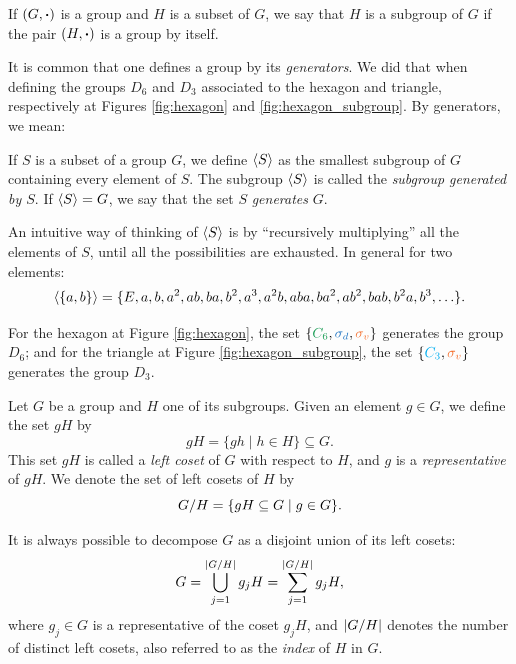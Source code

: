 \begin{definition} \label{def:subgroup}
If $(G, \vdot)$ is a group and $H$ is a subset of $G$, we say that $H$ is a subgroup of $G$ if the pair $(H, \vdot)$ is a group by itself.
\end{definition}

It is common that one defines a group by its \textit{generators}. We did that when defining the groups $D_6$ and $D_3$ associated to the hexagon and triangle, respectively at Figures \ref{fig:hexagon} and \ref{fig:hexagon_subgroup}. By generators, we mean:

\begin{definition} \label{def:generators_of_group}
If $S$ is a subset of a group $G$, we define $\ev{S}$ as the smallest subgroup of $G$ containing every element of $S$. The subgroup $\ev{S}$ is called the \textit{subgroup generated by $S$}. If $\ev{S} = G$, we say that the set $S$ \textit{generates} $G$.
\end{definition}


\begin{example} \label{ex:generators_example}
An intuitive way of thinking of $\ev{S}$ is by ``recursively multiplying'' all the elements of $S$, until all the possibilities are exhausted. In general for two elements:
\begin{equation} \label{eq:generate_two_elements}
\ev{\{a,b\}} = \{E, a, b, a^2, ab, ba, b^2, a^3, a^2b, aba, ba^2, ab^2, bab, b^2a, b^3, \ldots\}.
\end{equation}

For the hexagon at Figure \ref{fig:hexagon}, the set $\{\Cs, \sd, \sv\}$ generates the group $D_6$; and for the triangle at Figure \ref{fig:hexagon_subgroup}, the set $\{\Ct, \sv\}$ generates the group $D_3$.
\end{example}


\begin{definition} \label{def:left_cosets}
Let $G$ be a group and $H$ one of its subgroups. Given an element $g \in G$, we define the set $gH$ by
\begin{equation} \label{eq:gH_left_coset}
gH = \{g h \mid h \in H\} \subseteq G.
\end{equation}
This set $gH$ is called a \textit{left coset} of $G$ with respect to $H$, and $g$ is a \textit{representative} of $gH$. We denote the set of left cosets of $H$ by
\begin{equation} \label{eq:G/H_left_cosets}
G/H = \qty{gH \subseteq G \mid g \in G}.
\end{equation}

It is always possible to decompose $G$ as a disjoint union of its left cosets:
\begin{equation} \label{eq:disjoint_union_leftcosets}
G = \bigcup_{j=1}^{\abs{G/H}} g_j H = \sum_{j=1}^{\abs{G/H}} g_j H,
\end{equation}
where \( g_j \in G \) is a representative of the coset \( g_j H \), and \( \abs{G/H} \) denotes the number of distinct left cosets, also referred to as the \textit{index} of \( H \) in \( G \).
\end{definition}

